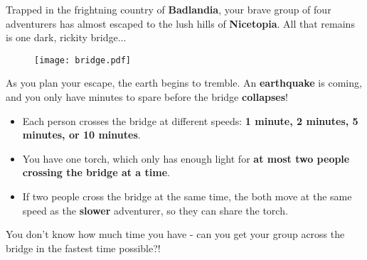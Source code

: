 

\newcommand{\activityname}{
  Math Abridged
}
\newcommand{\subtitle}{
  An Optimal Optimization Puzzle
}



Trapped in the frightning country of \textbf{Badlandia}, your brave group of four adventurers has almost escaped to the lush hills of \textbf{Nicetopia}. All that remains is one dark, rickity bridge...

\begin{figure}[h]
\begin{center}
\texttt{[image: bridge.pdf]}
\end{center}
\end{figure}

As you plan your escape, the earth begins to tremble. An \textbf{earthquake} is coming, and you only have minutes to spare before the bridge \textbf{collapses}!

\begin{itemize}
\item Each person crosses the bridge at different speeds: \textbf{1 minute, 2 minutes, 5 minutes, or 10 minutes}.
\item You have one torch, which only has enough light for \textbf{at most two people crossing the bridge at a time}.
\item If two people cross the bridge at the same time, the both move at the same speed as the \textbf{slower} adventurer, so they can share the torch.
\end{itemize}

You don't know how much time you have - can you get your group across the bridge in the fastest time possible?!

